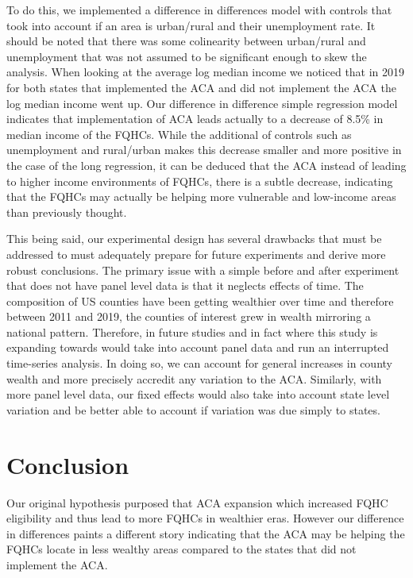 \documentclass[12pt, ]{article}
\begin{document}
To do this, we implemented a difference in differences model with
controls that took into account if an area is urban/rural and their
unemployment rate. It should be noted that there was some colinearity
between urban/rural and unemployment that was not assumed to be
significant enough to skew the analysis. When looking at the average log
median income we noticed that in 2019 for both states that implemented
the ACA and did not implement the ACA the log median income went up. Our
difference in difference simple regression model indicates that
implementation of ACA leads actually to a decrease of 8.5\% in median
income of the FQHCs. While the additional of controls such as
unemployment and rural/urban makes this decrease smaller and more
positive in the case of the long regression, it can be deduced that the
ACA instead of leading to higher income environments of FQHCs, there is
a subtle decrease, indicating that the FQHCs may actually be helping
more vulnerable and low-income areas than previously thought.

This being said, our experimental design has several drawbacks that must
be addressed to must adequately prepare for future experiments and
derive more robust conclusions. The primary issue with a simple before
and after experiment that does not have panel level data is that it
neglects effects of time. The composition of US counties have been
getting wealthier over time and therefore between 2011 and 2019, the
counties of interest grew in wealth mirroring a national pattern.
Therefore, in future studies and in fact where this study is expanding
towards would take into account panel data and run an interrupted
time-series analysis. In doing so, we can account for general increases
in county wealth and more precisely accredit any variation to the ACA.
Similarly, with more panel level data, our fixed effects would also take
into account state level variation and be better able to account if
variation was due simply to states.

\hypertarget{conclusion}{%
\section{Conclusion}\label{conclusion}}

Our original hypothesis purposed that ACA expansion which increased FQHC
eligibility and thus lead to more FQHCs in wealthier eras. However our
difference in differences paints a different story indicating that the
ACA may be helping the FQHCs locate in less wealthy areas compared to
the states that did not implement the ACA.
\end{document}
